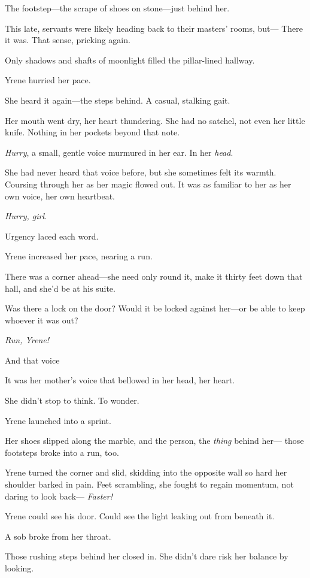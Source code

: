 The footstep---the scrape of shoes on stone---just behind her.

This late, servants were likely heading back to their masters' rooms, but--- There it was.
That sense, pricking again.

Only shadows and shafts of moonlight filled the pillar-lined hallway.

Yrene hurried her pace.

She heard it again---the steps behind.
A casual, stalking gait.

Her mouth went dry, her heart thundering.
She had no satchel, not even her little knife.
Nothing in her pockets beyond that note.

\emph{Hurry}, a small, gentle voice murmured in her ear.
In her \emph{head}.

She had never heard that voice before, but she sometimes felt its warmth.
Coursing through her as her magic flowed out.
It was as familiar to her as her own voice, her own heartbeat.

\emph{Hurry, girl.}

Urgency laced each word.

Yrene increased her pace, nearing a run.

There was a corner ahead---she need only round it, make it thirty feet down that hall, and she'd be at his suite.

Was there a lock on the door?
Would it be locked against her---or be able to keep whoever it was out?

\emph{Run, Yrene!}

And that voice 

It was her mother's voice that bellowed in her head, her heart.

She didn't stop to think.
To wonder.

Yrene launched into a sprint.

Her shoes slipped along the marble, and the person, the \emph{thing}
behind her--- those footsteps broke into a run, too.

Yrene turned the corner and slid, skidding into the opposite wall so hard her shoulder barked in pain.
Feet scrambling, she fought to regain momentum, not daring to look back--- \emph{Faster!}

Yrene could see his door.
Could see the light leaking out from beneath it.

A sob broke from her throat.

Those rushing steps behind her closed in.
She didn't dare risk her balance by looking.

